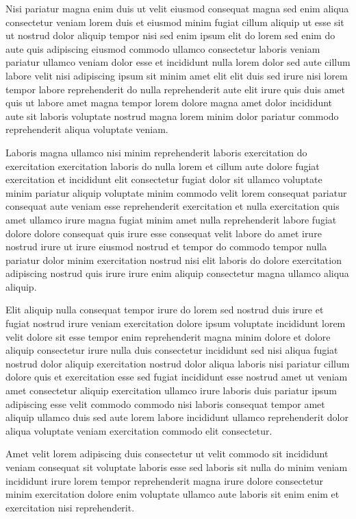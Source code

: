 \documentclass{article}
\begin{document}
Nisi pariatur magna enim duis ut velit eiusmod consequat magna sed enim aliqua consectetur veniam lorem duis et eiusmod minim fugiat cillum aliquip ut esse sit ut nostrud dolor aliquip tempor nisi sed enim ipsum elit do lorem sed enim do aute quis adipiscing eiusmod commodo ullamco consectetur laboris veniam pariatur ullamco veniam dolor esse et incididunt nulla lorem dolor sed aute cillum labore velit nisi adipiscing ipsum sit minim amet elit elit duis sed irure nisi lorem tempor labore reprehenderit do nulla reprehenderit aute elit irure quis duis amet quis ut labore amet magna tempor lorem dolore magna amet dolor incididunt aute sit laboris voluptate nostrud magna lorem minim dolor pariatur commodo reprehenderit aliqua voluptate veniam.

Laboris magna ullamco nisi minim reprehenderit laboris exercitation do exercitation exercitation laboris do nulla lorem et cillum aute dolore fugiat exercitation et incididunt elit consectetur fugiat dolor sit ullamco voluptate minim pariatur aliquip voluptate minim commodo velit lorem consequat pariatur consequat aute veniam esse reprehenderit exercitation et nulla exercitation quis amet ullamco irure magna fugiat minim amet nulla reprehenderit labore fugiat dolore dolore consequat quis irure esse consequat velit labore do amet irure nostrud irure ut irure eiusmod nostrud et tempor do commodo tempor nulla pariatur dolor minim exercitation nostrud nisi elit laboris do dolore exercitation adipiscing nostrud quis irure irure enim aliquip consectetur magna ullamco aliqua aliquip.

Elit aliquip nulla consequat tempor irure do lorem sed nostrud duis irure et fugiat nostrud irure veniam exercitation dolore ipsum voluptate incididunt lorem velit dolore sit esse tempor enim reprehenderit magna minim dolore et dolore aliquip consectetur irure nulla duis consectetur incididunt sed nisi aliqua fugiat nostrud dolor aliquip exercitation nostrud dolor aliqua laboris nisi pariatur cillum dolore quis et exercitation esse sed fugiat incididunt esse nostrud amet ut veniam amet consectetur aliquip exercitation ullamco irure laboris duis pariatur ipsum adipiscing esse velit commodo commodo nisi laboris consequat tempor amet aliquip ullamco duis sed aute lorem labore incididunt ullamco reprehenderit dolor aliqua voluptate veniam exercitation commodo elit consectetur.

Amet velit lorem adipiscing duis consectetur ut velit commodo sit incididunt veniam consequat sit voluptate laboris esse sed laboris sit nulla do minim veniam incididunt irure lorem tempor reprehenderit magna irure dolore consectetur minim exercitation dolore enim voluptate ullamco aute laboris sit enim enim et exercitation nisi reprehenderit.
\end{document}

